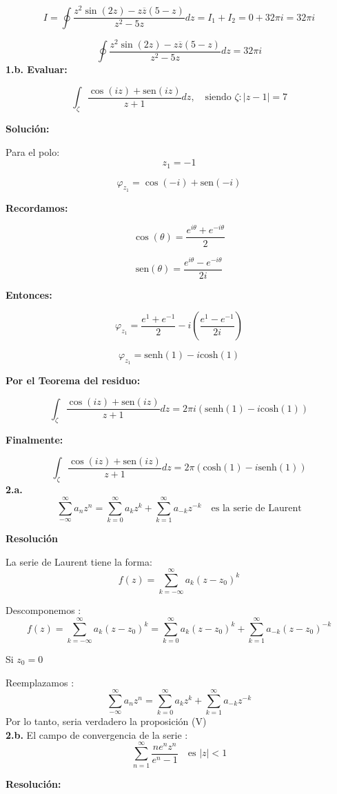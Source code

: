 \documentclass[a4paper,12pt]{article}
\begin{document}
\[
I = \oint \frac{z^2 \sin(2z) - z\overline{z}(5-z)}{z^2-5z} dz = I_1 + I_2 = 0 + 32\pi i = 32\pi i
\]

\[
\oint \frac{z^2 \sin(2z) - z\overline{z}(5-z)}{z^2-5z} dz = 32\pi i
\]
\textbf{1.b. Evaluar:}

\[
\int_{\zeta} \frac{\cos(iz) + \text{sen}(iz)}{z+1} dz, \quad \text{siendo } \zeta: |z-1| = 7
\]

\textbf{Solución:}

Para el polo:
\[
z_1 = -1
\]

\[
\varphi_{z_1} = \cos(-i) + \text{sen}(-i)
\]

\textbf{Recordamos:}

\[
\cos(\theta) = \frac{e^{i\theta} + e^{-i\theta}}{2}
\]

\[
\text{sen}(\theta) = \frac{e^{i\theta} - e^{-i\theta}}{2i}
\]

\textbf{Entonces:}

\[
\varphi_{z_1} = \frac{e^1 + e^{-1}}{2} - i\left(\frac{e^1 - e^{-1}}{2i}\right)
\]

\[
\varphi_{z_1} = \text{senh}(1) - i\text{cosh}(1)
\]

\textbf{Por el Teorema del residuo:}

\[
\int_{\zeta} \frac{\cos(iz) + \text{sen}(iz)}{z+1} dz = 2\pi i (\text{senh}(1) - i\text{cosh}(1))
\]

\textbf{Finalmente:}

\[
\int_{\zeta} \frac{\cos(iz) + \text{sen}(iz)}{z+1} dz = 2\pi (\text{cosh}(1) - i\text{senh}(1))
\]
\textbf{2.a.}
\[
\sum_{-\infty}^{\infty} a_n z^n = \sum_{k=0}^{\infty} a_k z^k + \sum_{k=1}^{\infty} a_{-k} z^{-k} \quad \text{es la serie de Laurent}
\]

\textbf{Resolución}

La serie de Laurent tiene la forma:
\[
f(z) = \sum_{k=-\infty}^{\infty} a_k (z - z_0)^k
\]

Descomponemos :
\[
f(z) = \sum_{k=-\infty}^{\infty} a_k (z - z_0)^k = \sum_{k=0}^{\infty} a_k (z - z_0)^k + \sum_{k=1}^{\infty} a_{-k} (z - z_0)^{-k}
\]

Si $z_0 = 0$

Reemplazamos :
\[
\sum_{-\infty}^{\infty} a_n z^n = \sum_{k=0}^{\infty} a_k z^k + \sum_{k=1}^{\infty} a_{-k} z^{-k}
\]
Por lo tanto, seria verdadero la proposición (V)\\
\textbf{2.b.} El campo de convergencia de la serie : 
\[
\sum_{n=1}^{\infty} \frac{ne^n z^n}{e^n - 1} \quad \text{es } |z| < 1
\]

\textbf{Resolución:}
\end{document}
